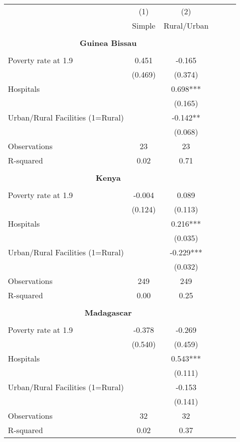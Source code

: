 \begin{tabular}{l*{5}{c}} \hline\hline
                &\multicolumn{1}{c}{(1)}&\multicolumn{1}{c}{(2)}\\
                &\multicolumn{1}{c}{Simple}&\multicolumn{1}{c}{Rural/Urban}\\
\hline \\ \multicolumn{3}{c}{\textbf{Guinea Bissau}} \\\\[-1ex]
Poverty rate at 1.9&    0.451   &   -0.165   \\
                &  (0.469)   &  (0.374)   \\
Hospitals       &            &    0.698***\\
                &            &  (0.165)   \\
Urban/Rural Facilities (1=Rural)&            &   -0.142** \\
                &            &  (0.068)   \\
\hline
Observations    &       23   &       23   \\
R-squared       &     0.02   &     0.71   \\
\hline \\ \multicolumn{3}{c}{\textbf{Kenya}} \\\\[-1ex]
Poverty rate at 1.9&   -0.004   &    0.089   \\
                &  (0.124)   &  (0.113)   \\
Hospitals       &            &    0.216***\\
                &            &  (0.035)   \\
Urban/Rural Facilities (1=Rural)&            &   -0.229***\\
                &            &  (0.032)   \\
\hline
Observations    &      249   &      249   \\
R-squared       &     0.00   &     0.25   \\
\hline \\ \multicolumn{3}{c}{\textbf{Madagascar}} \\\\[-1ex]
Poverty rate at 1.9&   -0.378   &   -0.269   \\
                &  (0.540)   &  (0.459)   \\
Hospitals       &            &    0.543***\\
                &            &  (0.111)   \\
Urban/Rural Facilities (1=Rural)&            &   -0.153   \\
                &            &  (0.141)   \\
\hline
Observations    &       32   &       32   \\
R-squared       &     0.02   &     0.37   \\
\hline\hline \end{tabular}
